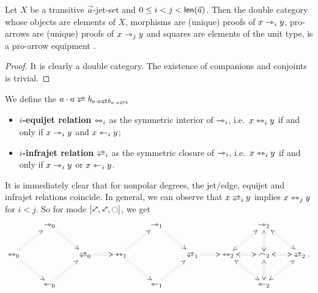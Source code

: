 \documentclass[a4paper]{memoir}
\begin{document}
\begin{proposition} \label{thm:jetset-equipment}
	Let $X$ be a transitive $\vec a$-jet-set and $0 \leq i < j < \mathsf{len}(\vec a)$.
	Then the double category whose objects are elements of $X$, morphisms are (unique) proofs of $x \rightarrowtriangle_i y$, pro-arrows are (unique) proofs of $x \rightarrowtriangle_{j} y$ and squares are elements of the unit type, is a pro-arrow equipment \cite{nlab:proarrow,proarrow1,proarrow2}.
\end{proposition}
\begin{proof}
	It is clearly a double category. The existence of companions and conjoints is trivial.
\end{proof}
\begin{definition}
	We define the $a \cdot a \infrajet b_{a \cdot a \infrajet b_{a \cdot a \infrajet b}}$
	\begin{itemize}
		\item \textbf{$i$-equijet relation} $\leftrightarrowtriangle_i$ as the symmetric interior of $\rightarrowtriangle_i$, i.e.\ $x \leftrightarrowtriangle_i y$ if and only if $x \rightarrowtriangle_i y$ and $x \leftarrowtriangle_i y$;
		\item \textbf{$i$-infrajet relation} $\infrajet_i$ as the symmetric closure of $\rightarrowtriangle_i$, i.e.\ $x \leftrightarrowtriangle_i y$ if and only if $x \rightarrowtriangle_i y$ or $x \leftarrowtriangle_i y$.
	\end{itemize}
\end{definition}
It is immediately clear that for nonpolar degrees, the jet/edge, equijet and infrajet relations coincide.
In general, we can observe that $x \infrajet_i y$ implies $x \leftrightarrowtriangle_j y$ for $i < j$.
So for mode $[\ypolar, \ypolar, \npolar]$, we get
\[
\xymatrix{
	& 
	\jet_0
		\ar@{:>}[rd]
	&&& 
	\jet_1 
		\ar@{:>}[rd]
	&&& 
	\jet_2 
		\ar@{<:>}[rd]
	\\
	\equijet_0
		\ar@{:>}[ru]
		\ar@{:>}[rd]
	&&
	\infrajet_0
		\ar@{:>}[r]
	&
	\equijet_1
		\ar@{:>}[ru]
		\ar@{:>}[rd]
	&&
	\infrajet_1
		\ar@{:>}[r]
	&
	\equijet_2
		\ar@{<:>}[ru]
		\ar@{<:>}[rd]
	&
	\edge_2
		\ar@{<:>}[l]
		\ar@{<:>}[u]
		\ar@{<:>}[r]
		\ar@{<:>}[d]
	&
	\infrajet_2.
	\\
	& 
	\tej_0 
		\ar@{:>}[ru]
	&&& 
	\tej_1 
		\ar@{:>}[ru]
	&&& 
	\tej_2 
		\ar@{<:>}[ru]
}
\]
\end{document}
